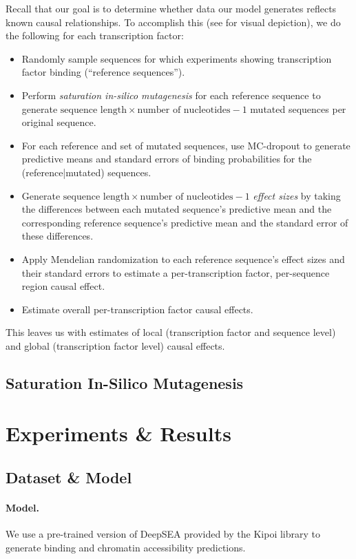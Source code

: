 \documentclass{article}
\begin{document}
Recall that our goal is to determine whether data our model generates reflects known causal relationships. To accomplish this (see  for visual depiction), we do the following for each transcription factor:
\begin{itemize}
    \item Randomly sample sequences for which experiments showing transcription factor binding (``reference sequences'').
    \item Perform \textit{saturation in-silico mutagenesis} for each reference sequence to generate \( \text{sequence\ length} \times \text{number\ of\ nucleotides} - 1 \) mutated sequences per original sequence.
    \item For each reference and set of mutated sequences, use MC-dropout  to generate predictive means and standard errors of binding probabilities for the (reference|mutated) sequences.
    \item Generate \( \text{sequence length} \times \text{number of nucleotides} - 1 \) \textit{effect sizes} by taking the differences between each mutated sequence's predictive mean and the corresponding reference sequence's predictive mean and the standard error of these differences.
    \item Apply Mendelian randomization to each reference sequence's effect sizes and their standard errors to estimate a per-transcription factor, per-sequence region causal effect.
    \item {} Estimate overall per-transcription factor causal effects.
\end{itemize}

This leaves us with estimates of local (transcription factor and sequence level) and global (transcription factor level) causal effects. 

\subsection{Saturation In-Silico Mutagenesis}


\section{Experiments \& Results}

\subsection{Dataset \& Model}
\paragraph{Model.}
We use a pre-trained version of DeepSEA  provided by the Kipoi  library to generate binding and chromatin accessibility predictions.
\end{document}
